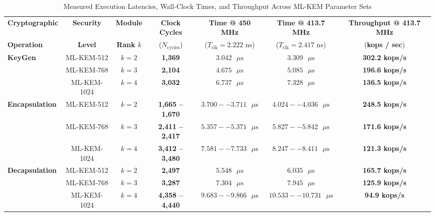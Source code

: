 \begin{table}[t]
\caption{Measured Execution Latencies, Wall-Clock Times, and Throughput Across ML-KEM Parameter Sets}
\label{tab:operation_latencies}
\centering
\begin{tabular}{lcccccc}
\toprule
\textbf{Cryptographic} & \textbf{Security} & \textbf{Module} & \textbf{Clock Cycles} & \textbf{Time @ 450 MHz} & \textbf{Time @ 413.7 MHz} & \textbf{Throughput @ 413.7 MHz} \\
\textbf{Operation} & \textbf{Level} & \textbf{Rank $k$} & ($N_{\text{cycles}}$) & ($T_{\text{clk}} = 2.222\text{ ns}$) & ($T_{\text{clk}} = 2.417\text{ ns}$) & (\textbf{kops / sec}) \\
\midrule
\multirow{3}{*}{\textbf{KeyGen}} 
& ML-KEM-512  & $k = 2$ & \textbf{1,369} & $3.042\text{ }\mu\text{s}$ & \textbf{$3.309\text{ }\mu\text{s}$} & \textbf{302.2 kops/s} \\
& ML-KEM-768  & $k = 3$ & \textbf{2,104} & $4.675\text{ }\mu\text{s}$ & \textbf{$5.085\text{ }\mu\text{s}$} & \textbf{196.6 kops/s} \\
& ML-KEM-1024 & $k = 4$ & \textbf{3,032} & $6.737\text{ }\mu\text{s}$ & \textbf{$7.328\text{ }\mu\text{s}$} & \textbf{136.5 kops/s} \\
\midrule
\multirow{3}{*}{\textbf{Encapsulation}} 
& ML-KEM-512  & $k = 2$ & \textbf{1,665 -- 1,670} & $3.700 -- 3.711\text{ }\mu\text{s}$ & \textbf{$4.024 -- 4.036\text{ }\mu\text{s}$} & \textbf{248.5 kops/s} \\
& ML-KEM-768  & $k = 3$ & \textbf{2,411 -- 2,417} & $5.357 -- 5.371\text{ }\mu\text{s}$ & \textbf{$5.827 -- 5.842\text{ }\mu\text{s}$} & \textbf{171.6 kops/s} \\
& ML-KEM-1024 & $k = 4$ & \textbf{3,412 -- 3,480} & $7.581 -- 7.733\text{ }\mu\text{s}$ & \textbf{$8.247 -- 8.411\text{ }\mu\text{s}$} & \textbf{121.3 kops/s} \\
\midrule
\multirow{3}{*}{\textbf{Decapsulation}} 
& ML-KEM-512  & $k = 2$ & \textbf{2,497} & $5.548\text{ }\mu\text{s}$ & \textbf{$6.035\text{ }\mu\text{s}$} & \textbf{165.7 kops/s} \\
& ML-KEM-768  & $k = 3$ & \textbf{3,287} & $7.304\text{ }\mu\text{s}$ & \textbf{$7.945\text{ }\mu\text{s}$} & \textbf{125.9 kops/s} \\
& ML-KEM-1024 & $k = 4$ & \textbf{4,358 -- 4,440} & $9.683 -- 9.866\text{ }\mu\text{s}$ & \textbf{$10.533 -- 10.731\text{ }\mu\text{s}$} & \textbf{94.9 kops/s} \\
\bottomrule
\end{tabular}
\end{table}

